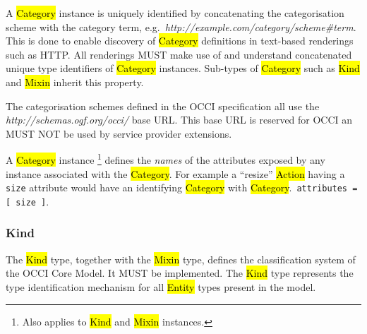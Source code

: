 \documentclass[10pt,a4paper]{article}
\begin{document}

A \hl{Category} instance is uniquely identified by concatenating the
categorisation scheme with the category term,
e.g.~\textit{http://example.com/category/scheme\#term}.  This is done
to enable discovery of \hl{Category} definitions in text-based
renderings such as HTTP. All renderings MUST make use of and
understand concatenated unique type identifiers of \hl{Category}
instances.
%
Sub-types of \hl{Category} such as \hl{Kind} and \hl{Mixin} inherit
this property.

The categorisation schemes defined in the OCCI specification all use
the \textit{http://schemas.ogf.org/occi/} base URL. This base URL is
reserved for OCCI an MUST NOT be used by service provider extensions.

A \hl{Category} instance%
\footnote{Also applies to \hl{Kind} and \hl{Mixin} instances.}
defines the {\em names} of the attributes exposed by any instance associated
with the \hl{Category}.  For example a ``resize'' \hl{Action} having a {\tt
size} attribute would have an identifying \hl{Category} with \hl{Category}.{\tt
attributes = [ size ]}.

\subsubsection{Kind}
\label{sec:kind}

The \hl{Kind} type, together with the \hl{Mixin} type, defines the
classification system of the OCCI Core Model. It MUST be
implemented. The \hl{Kind} type represents the type identification
mechanism for all \hl{Entity} types present in the model.
\end{document}
